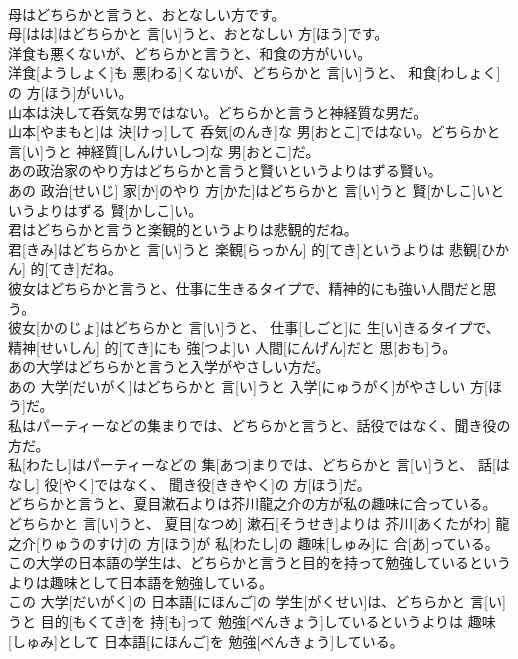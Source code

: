 \documentclass[8pt]{extreport}
\begin{document}
\begin{CJK}{UTF8}{min}
\\	母はどちらかと言うと、おとなしい方です。	
\\	母[はは]はどちらかと 言[い]うと、おとなしい 方[ほう]です。
\\	洋食も悪くないが、どちらかと言うと、和食の方がいい。	
\\	洋食[ようしょく]も 悪[わる]くないが、どちらかと 言[い]うと、 和食[わしょく]の 方[ほう]がいい。
\\	山本は決して呑気な男ではない。どちらかと言うと神経質な男だ。	
\\	山本[やまもと]は 決[けっ]して 呑気[のんき]な 男[おとこ]ではない。どちらかと 言[い]うと 神経質[しんけいしつ]な 男[おとこ]だ。
\\	あの政治家のやり方はどちらかと言うと賢いというよりはずる賢い。	
\\	あの 政治[せいじ] 家[か]のやり 方[かた]はどちらかと 言[い]うと 賢[かしこ]いというよりはずる 賢[かしこ]い。
\\	君はどちらかと言うと楽観的というよりは悲観的だね。	
\\	君[きみ]はどちらかと 言[い]うと 楽観[らっかん] 的[てき]というよりは 悲観[ひかん] 的[てき]だね。
\\	彼女はどちらかと言うと、仕事に生きるタイプで、精神的にも強い人間だと思う。	
\\	彼女[かのじょ]はどちらかと 言[い]うと、 仕事[しごと]に 生[い]きるタイプで、 精神[せいしん] 的[てき]にも 強[つよ]い 人間[にんげん]だと 思[おも]う。
\\	あの大学はどちらかと言うと入学がやさしい方だ。	
\\	あの 大学[だいがく]はどちらかと 言[い]うと 入学[にゅうがく]がやさしい 方[ほう]だ。
\\	私はパーティーなどの集まりでは、どちらかと言うと、話役ではなく、聞き役の方だ。	
\\	私[わたし]はパーティーなどの 集[あつ]まりでは、どちらかと 言[い]うと、 話[はなし] 役[やく]ではなく、 聞き役[ききやく]の 方[ほう]だ。
\\	どちらかと言うと、夏目漱石よりは芥川龍之介の方が私の趣味に合っている。	
\\	どちらかと 言[い]うと、 夏目[なつめ] 漱石[そうせき]よりは 芥川[あくたがわ] 龍之介[りゅうのすけ]の 方[ほう]が 私[わたし]の 趣味[しゅみ]に 合[あ]っている。
\\	この大学の日本語の学生は、どちらかと言うと目的を持って勉強しているというよりは趣味として日本語を勉強している。	
\\	この 大学[だいがく]の 日本語[にほんご]の 学生[がくせい]は、どちらかと 言[い]うと 目的[もくてき]を 持[も]って 勉強[べんきょう]しているというよりは 趣味[しゅみ]として 日本語[にほんご]を 勉強[べんきょう]している。

\end{CJK}
\end{document}
